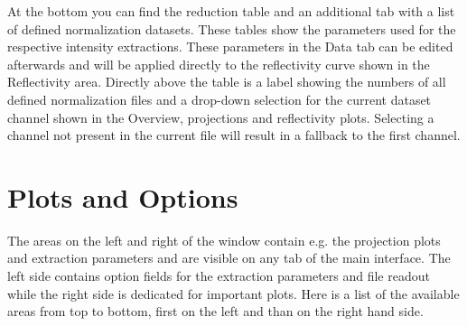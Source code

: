   At the bottom you can find the reduction table and an additional tab with a list of defined normalization datasets.
  These tables show the parameters used for the respective intensity extractions.
  These parameters in the Data tab can be edited afterwards and will be applied directly to the reflectivity curve shown in the Reflectivity area.
  Directly above the table is a label showing the numbers of all defined normalization files and a drop-down selection for the current dataset channel shown in the Overview, projections and reflectivity plots.
  Selecting a channel not present in the current file will result in a fallback to the first channel.
  
\section{Plots and Options}
  The areas on the left and right of the window contain e.g. the projection plots and extraction parameters and are visible on any tab of the main interface. The left side contains option fields for the extraction parameters and file readout while the right side is dedicated for important plots.
  Here is a list of the available areas from top to bottom, first on the left and than on the right hand side.
  
